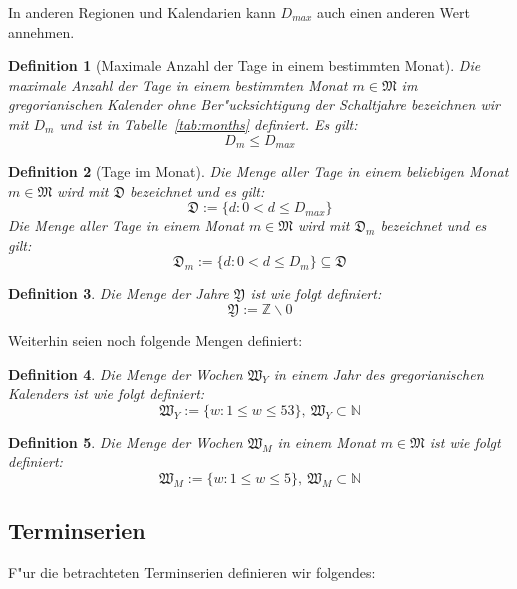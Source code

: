 \documentclass[a4paper]{article}
\newcommand*{\mondays}{\mathfrak{D}}
\newcommand*{\months}{\mathfrak{M}}
\newcommand*{\years}{\mathfrak{Y}}
\newcommand*{\weeksyr}{\mathfrak{W}_Y}
\newcommand*{\weeksmo}{\mathfrak{W}_M}
\numberwithin{equation}{section}
\newtheorem{dfn}{Definition}
\begin{document}
\noindent In anderen Regionen und Kalendarien kann $D_{max}$ auch einen anderen
Wert annehmen.
\begin{dfn}[Maximale Anzahl der Tage in einem bestimmten Monat]
  Die maximale Anzahl der Tage in einem bestimmten Monat $m \in \months$ im
  gregorianischen Kalender ohne Ber"ucksichtigung der Schaltjahre bezeichnen wir
  mit $D_m$ und ist in Tabelle~\ref{tab:months} definiert. Es gilt:
  \begin{equation}D_m \le D_{max}\end{equation}
\end{dfn}
\begin{dfn}[Tage im Monat]
  Die Menge aller Tage in einem beliebigen Monat $m \in \months$ wird mit
  $\mondays$ bezeichnet und es gilt:
  \begin{equation}\mondays := \{ d : 0 < d \le D_{max}\}\end{equation}
  Die Menge aller Tage in einem Monat $m \in \months$ wird mit $\mondays_m$
  bezeichnet und es gilt:
  \begin{equation}
    \mondays_m := \{ d : 0 < d \le D_m\} \subseteq \mondays
  \end{equation}
\end{dfn}
\begin{dfn}
  Die Menge der Jahre $\years$ ist wie folgt definiert:
  \begin{equation}\years := \mathbb{Z} \backslash 0\end{equation}
\end{dfn}

\noindent Weiterhin seien noch folgende Mengen definiert:
\begin{dfn}
  Die Menge der Wochen $\weeksyr$ in einem Jahr des gregorianischen Kalenders
  ist wie folgt definiert:
  \begin{equation}
    \weeksyr := \{ w : 1 \le w \le 53 \},\ \weeksyr \subset \mathbb{N}
  \end{equation}
\end{dfn}
\begin{dfn}
  Die Menge der Wochen $\weeksmo$ in einem Monat $m \in \months$ ist wie folgt
  definiert:
  \begin{equation}
    \weeksmo := \{ w : 1 \le w \le 5 \},\ \weeksmo \subset \mathbb{N}
  \end{equation}
\end{dfn}


%
%
\subsection{Terminserien}
F"ur die betrachteten Terminserien definieren wir folgendes:
\end{document}
